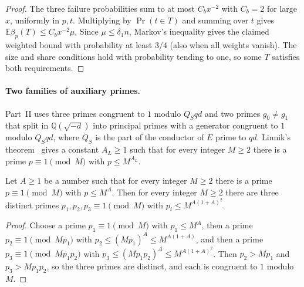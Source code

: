\begin{proof}
The three failure probabilities sum to at most $C_b x^{-2}$ with
$C_b=2$ for large $x$, uniformly in $p,t$. Multiplying by $\Pr(t\in T)$
and summing over $t$ gives $\mathbb E\beta_p(T)\le C_b x^{-2}\mu$.
Since $\mu\le\delta_1 n$, Markov's inequality gives the claimed weighted
bound with probability at least $3/4$ (also when all weights vanish).
The size and share conditions hold with probability tending to one, so
some $T$ satisfies both requirements.
\end{proof}

\paragraph{Two families of auxiliary primes.} Part~II uses three primes congruent to $1$ modulo $Q_Sqd$ and two primes $g_0\ne g_1$ that split in $\mathbb Q(\sqrt{-d})$ into principal primes with a generator congruent to $1$ modulo $Q_Sqd$, where $Q_S$ is the part of the conductor of $E$ prime to $qd$. Linnik's theorem~\cite{linnik} gives a constant $A_L\ge1$ such that for every integer $M\ge2$ there is a prime $p\equiv1\pmod M$ with $p\le M^{A_L}$.

\begin{lemma}\label{three}
Let $A\ge1$ be a number such that for every integer $M\ge2$ there is a prime $p\equiv1\pmod M$ with $p\le M^A$. Then for every integer $M\ge2$ there are three distinct primes $p_1,p_2,p_3\equiv1\pmod M$ with $p_i\le M^{A(1+A)^2}$.
\end{lemma}

\begin{proof}
Choose a prime $p_1\equiv1\pmod M$ with $p_1\le M^A$, then a prime $p_2\equiv1\pmod{Mp_1}$ with $p_2\le(Mp_1)^A\le M^{A(1+A)}$, and then a prime $p_3\equiv1\pmod{Mp_1p_2}$ with $p_3\le(Mp_1p_2)^A\le M^{A(1+A)^2}$. Then $p_2>Mp_1$ and $p_3>Mp_1p_2$, so the three primes are distinct, and each is congruent to $1$ modulo $M$.
\end{proof}

